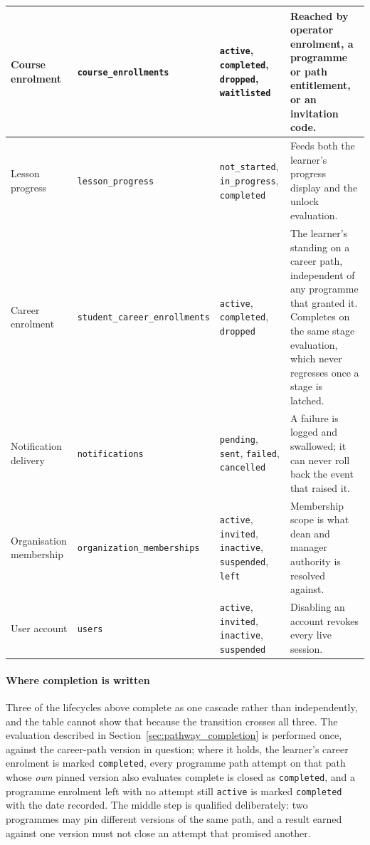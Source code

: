 \begin{longtable}{|>{\raggedright\arraybackslash}m{}|>{\raggedright\arraybackslash}m{}|>{\raggedright\arraybackslash}m{}|>{\raggedright\arraybackslash}m{}|}
Course enrolment & \texttt{course\_enrollments} & \texttt{active}, \texttt{completed}, \texttt{dropped}, \texttt{waitlisted} & Reached by operator enrolment, a programme or path entitlement, or an invitation code. \\ \hline
Lesson progress & \texttt{lesson\_progress} & \texttt{not\_started}, \texttt{in\_progress}, \texttt{completed} & Feeds both the learner's progress display and the unlock evaluation. \\ \hline
Career enrolment & \texttt{student\_career\_enrollments} & \texttt{active}, \texttt{completed}, \texttt{dropped} & The learner's standing on a career path, independent of any programme that granted it. Completes on the same stage evaluation, which never regresses once a stage is latched. \\ \hline
Notification delivery & \texttt{notifications} & \texttt{pending}, \texttt{sent}, \texttt{failed}, \texttt{cancelled} & A failure is logged and swallowed; it can never roll back the event that raised it. \\ \hline
Organisation membership & \texttt{organization\_memberships} & \texttt{active}, \texttt{invited}, \texttt{inactive}, \texttt{suspended}, \texttt{left} & Membership scope is what dean and manager authority is resolved against. \\ \hline
User account & \texttt{users} & \texttt{active}, \texttt{invited}, \texttt{inactive}, \texttt{suspended} & Disabling an account revokes every live session. \\
\end{longtable}

\paragraph{Where completion is written}
Three of the lifecycles above complete as one cascade rather than independently, and the table cannot show that because the transition crosses all three. The evaluation described in Section~\ref{sec:pathway_completion} is performed once, against the career-path version in question; where it holds, the learner's career enrolment is marked \texttt{completed}, every programme path attempt on that path whose \emph{own} pinned version also evaluates complete is closed as \texttt{completed}, and a programme enrolment left with no attempt still \texttt{active} is marked \texttt{completed} with the date recorded. The middle step is qualified deliberately: two programmes may pin different versions of the same path, and a result earned against one version must not close an attempt that promised another.


